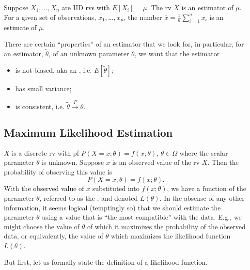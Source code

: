 \documentclass[notoc,notitlepage]{tufte-book}
\newcommand{\convp}{\overset{P}{\to}}
\begin{document}
\begin{eg}
  Suppose $X_1, ..., X_n$ are IID rvs with $E[X_i] = \mu$. The rv $\bar{X}$ is an estimator of $\mu$. For a given set of observations, $x_1, ..., x_n$, the number $\bar{x} = \frac{1}{n} \sum_{i=1}^{n} x_i$ is an estimate of $\mu$.
\end{eg}

There are certain ``properties'' of an estimator that we look for, in particular, for an estimator, $\tilde{\theta}$, of an unknown parameter $\theta$, we want that the estimator
\begin{itemize}
  \item is not biased, aka an , i.e. $E[\tilde{\theta}]$;
  \item has small variance;
  \item is consistent, i.e. $\tilde{\theta} \convp \theta$.
\end{itemize}

\subsection{Maximum Likelihood Estimation}%
\label{sub:maximum_likelihood_estimation}

 $X$ is a discrete rv with pf $P(X = x; \theta) = f(x; \theta), \, \theta \in \Omega$ where the scalar parameter $\theta$ is unknown. Suppose $x$ is an observed value of the rv $X$. Then the probability of observing this value is
\begin{equation*}
  P(X = x; \theta) = f(x; \theta).
\end{equation*}
With the observed value of $x$ substituted into $f(x; \theta)$, we have a function of the parameter $\theta$, referred to as the , and denoted $L(\theta)$. In the absense of any other information, it seems logical (temptingly so) that we should estimate the parameter $\theta$ using a value that is ``the most compatible'' with the data. E.g., we might choose the value of $\theta$ of which it maximizes the probability of the observed data, or equivalently, the value of $\theta$ which maximizes the likelihood function $L(\theta)$.

But first, let us formally state the definition of a likelihood function.
\end{document}
